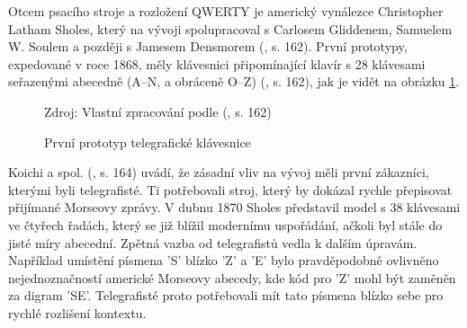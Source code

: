 \documentclass[a4paper, twoside, 12pt, czech]{article}
\begin{document}
Otcem psacího stroje a rozložení QWERTY je americký vynálezce Christopher Latham 
Sholes, který na vývoji spolupracoval s Carlosem Gliddenem, Samuelem W. Soulem 
a později s Jamesem Densmorem (\cite{prehistory}, s. 162). První prototypy, expedované v roce 1868, měly 
klávesnici připomínající klavír s 28 klávesami seřazenými abecedně (A–N, a obráceně O–Z) 
(\cite{prehistory}, s. 162), jak je vidět na obrázku \ref{pic:prvnikeeb}.
\begin{figure}[h]
    \centering
    \caption{První prototyp telegrafické klávesnice}
    \vspace{0.5cm}
    
    \small{Zdroj: Vlastní zpracování podle (\cite{prehistory}, s. 162)}
    \label{pic:prvnikeeb}
\end{figure}

Koichi a spol. (\cite{prehistory}, s. 164) uvádí, že zásadní vliv na vývoj měli první zákazníci, kterými byli telegrafisté. 
Ti potřebovali stroj, který by dokázal rychle přepisovat přijímané Morseovy 
zprávy. V dubnu 1870 Sholes představil model s 38 klávesami ve čtyřech řadách, 
který se již blížil modernímu uspořádání, ačkoli byl stále do jisté míry abecední.
Zpětná vazba od telegrafistů vedla k dalším úpravám. Napří\-klad umístění písmena 
'S' blízko 'Z' a 'E' bylo pravděpodobně ovlivněno nejednoznačností americké 
Morseovy abecedy, kde kód pro 'Z' mohl být zaměněn za digram 'SE'. 
Telegrafisté proto potřebovali mít tato písmena blízko sebe pro rychlé rozlišení 
kontextu.
\end{document}
